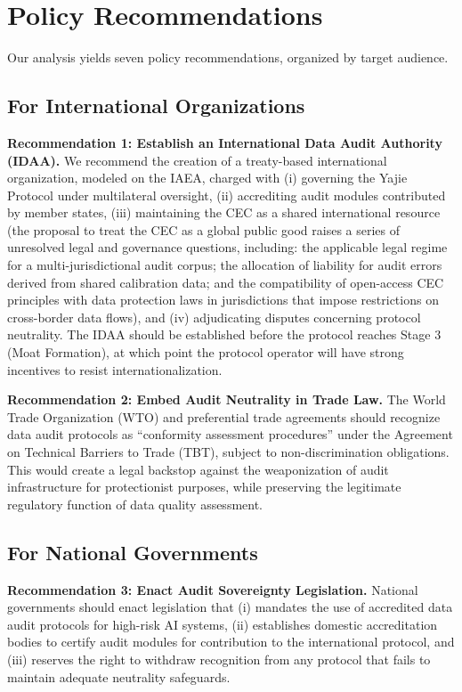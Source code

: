 \documentclass[12pt,a4paper]{article}
\theoremstyle{definition}
\theoremstyle{remark}
\begin{document}
\section{Policy Recommendations}

Our analysis yields seven policy recommendations, organized by target audience.

\subsection{For International Organizations}

\textbf{Recommendation 1: Establish an International Data Audit Authority (IDAA).} We recommend the creation of a treaty-based international organization, modeled on the IAEA, charged with (i) governing the Yajie Protocol under multilateral oversight, (ii) accrediting audit modules contributed by member states, (iii) maintaining the CEC as a shared international resource (the proposal to treat the CEC as a global public good raises a series of unresolved legal and governance questions, including: the applicable legal regime for a multi-jurisdictional audit corpus; the allocation of liability for audit errors derived from shared calibration data; and the compatibility of open-access CEC principles with data protection laws in jurisdictions that impose restrictions on cross-border data flows), and (iv) adjudicating disputes concerning protocol neutrality. The IDAA should be established before the protocol reaches Stage 3 (Moat Formation), at which point the protocol operator will have strong incentives to resist internationalization.

\textbf{Recommendation 2: Embed Audit Neutrality in Trade Law.} The World Trade Organization (WTO) and preferential trade agreements should recognize data audit protocols as ``conformity assessment procedures'' under the Agreement on Technical Barriers to Trade (TBT), subject to non-discrimination obligations. This would create a legal backstop against the weaponization of audit infrastructure for protectionist purposes, while preserving the legitimate regulatory function of data quality assessment.

\subsection{For National Governments}

\textbf{Recommendation 3: Enact Audit Sovereignty Legislation.} National governments should enact legislation that (i) mandates the use of accredited data audit protocols for high-risk AI systems, (ii) establishes domestic accreditation bodies to certify audit modules for contribution to the international protocol, and (iii) reserves the right to withdraw recognition from any protocol that fails to maintain adequate neutrality safeguards.
\end{document}
